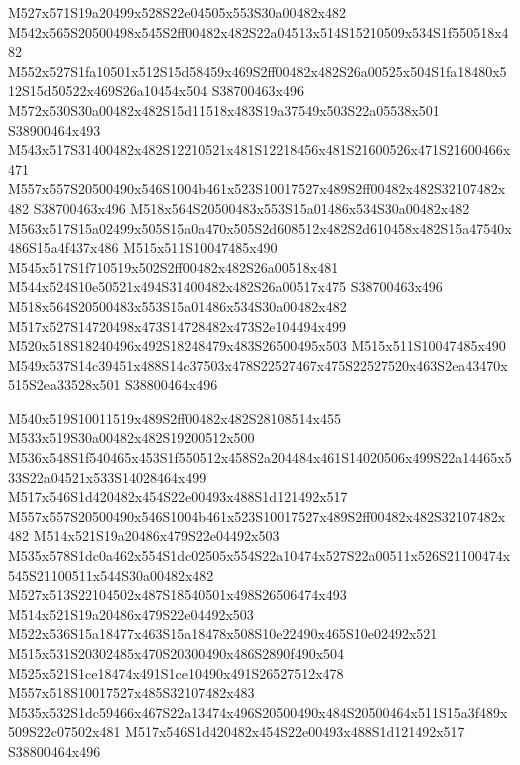 \documentclass{article}
\begin{document}
\begin{multicols}{2}
M527x571S19a20499x528S22e04505x553S30a00482x482 M542x565S20500498x545S2ff00482x482S22a04513x514S15210509x534S1f550518x482 M552x527S1fa10501x512S15d58459x469S2ff00482x482S26a00525x504S1fa18480x512S15d50522x469S26a10454x504 S38700463x496 M572x530S30a00482x482S15d11518x483S19a37549x503S22a05538x501 S38900464x493 M543x517S31400482x482S12210521x481S12218456x481S21600526x471S21600466x471 M557x557S20500490x546S1004b461x523S10017527x489S2ff00482x482S32107482x482 S38700463x496 M518x564S20500483x553S15a01486x534S30a00482x482 M563x517S15a02499x505S15a0a470x505S2d608512x482S2d610458x482S15a47540x486S15a4f437x486 M515x511S10047485x490 M545x517S1f710519x502S2ff00482x482S26a00518x481 M544x524S10e50521x494S31400482x482S26a00517x475 S38700463x496 M518x564S20500483x553S15a01486x534S30a00482x482 M517x527S14720498x473S14728482x473S2e104494x499 M520x518S18240496x492S18248479x483S26500495x503 M515x511S10047485x490 M549x537S14c39451x488S14c37503x478S22527467x475S22527520x463S2ea43470x515S2ea33528x501 S38800464x496

M540x519S10011519x489S2ff00482x482S28108514x455 M533x519S30a00482x482S19200512x500 M536x548S1f540465x453S1f550512x458S2a204484x461S14020506x499S22a14465x533S22a04521x533S14028464x499 M517x546S1d420482x454S22e00493x488S1d121492x517 M557x557S20500490x546S1004b461x523S10017527x489S2ff00482x482S32107482x482 M514x521S19a20486x479S22e04492x503 M535x578S1dc0a462x554S1dc02505x554S22a10474x527S22a00511x526S21100474x545S21100511x544S30a00482x482 M527x513S22104502x487S18540501x498S26506474x493 M514x521S19a20486x479S22e04492x503 M522x536S15a18477x463S15a18478x508S10e22490x465S10e02492x521 M515x531S20302485x470S20300490x486S2890f490x504 M525x521S1ce18474x491S1ce10490x491S26527512x478 M557x518S10017527x485S32107482x483 M535x532S1dc59466x467S22a13474x496S20500490x484S20500464x511S15a3f489x509S22c07502x481 M517x546S1d420482x454S22e00493x488S1d121492x517 S38800464x496


\end{multicols}
\end{document}
